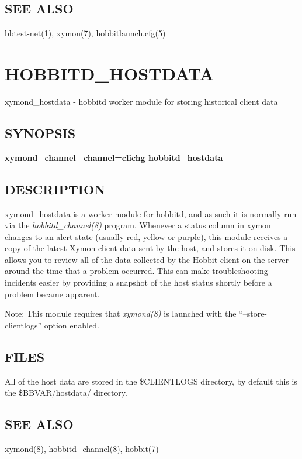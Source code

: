 \subsection{SEE ALSO}
bbtest-net(1), xymon(7), hobbitlaunch.cfg(5) 

 
  
%
%

\newpage
\section{HOBBITD\_HOSTDATA}

 xymond\_hostdata - hobbitd worker module for storing historical
 client data 
\subsection{SYNOPSIS}
\textbf{xymond\_channel --channel=clichg hobbitd\_hostdata}


 
\subsection{DESCRIPTION}
 xymond\_hostdata is a worker module for hobbitd, and as such it is normally run via the \emph{hobbitd\_channel(8)}
 program. Whenever a status column in xymon changes to an alert state (usually red, yellow or purple), this module receives a copy of the latest Xymon client data sent by the host, and stores it on disk. This allows you to review all of the data collected by the Hobbit client on the server around the time that a problem occurred. This can make troubleshooting incidents easier by providing a snapshot of the host status shortly before a problem became apparent. 

  Note: This module requires that \emph{xymond(8)}
 is launched with the ``--store-clientlogs'' option enabled. 


 
\subsection{FILES}
 All of the host data are stored in the \$CLIENTLOGS directory, by default this is the \$BBVAR/hostdata/ directory. 

 
\subsection{SEE ALSO}
xymond(8), hobbitd\_channel(8), hobbit(7) 

